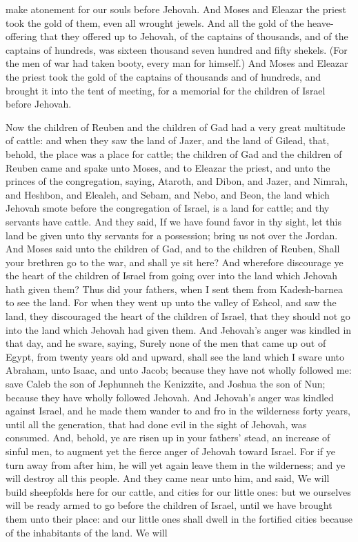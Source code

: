 make atonement for our souls before Jehovah. And Moses and Eleazar the priest took the gold of them, even all wrought jewels. And all the gold of the heave-offering that they offered up to Jehovah, of the captains of thousands, and of the captains of hundreds, was sixteen thousand seven hundred and fifty shekels. (For the men of war had taken booty, every man for himself.) And Moses and Eleazar the priest took the gold of the captains of thousands and of hundreds, and brought it into the tent of meeting, for a memorial for the children of Israel before Jehovah. 

Now the children of Reuben and the children of Gad had a very great multitude of cattle: and when they saw the land of Jazer, and the land of Gilead, that, behold, the place was a place for cattle; the children of Gad and the children of Reuben came and spake unto Moses, and to Eleazar the priest, and unto the princes of the congregation, saying, Ataroth, and Dibon, and Jazer, and Nimrah, and Heshbon, and Elealeh, and Sebam, and Nebo, and Beon, the land which Jehovah smote before the congregation of Israel, is a land for cattle; and thy servants have cattle. And they said, If we have found favor in thy sight, let this land be given unto thy servants for a possession; bring us not over the Jordan.  And Moses said unto the children of Gad, and to the children of Reuben, Shall your brethren go to the war, and shall ye sit here? And wherefore discourage ye the heart of the children of Israel from going over into the land which Jehovah hath given them? Thus did your fathers, when I sent them from Kadesh-barnea to see the land. For when they went up unto the valley of Eshcol, and saw the land, they discouraged the heart of the children of Israel, that they should not go into the land which Jehovah had given them. And Jehovah’s anger was kindled in that day, and he sware, saying, Surely none of the men that came up out of Egypt, from twenty years old and upward, shall see the land which I sware unto Abraham, unto Isaac, and unto Jacob; because they have not wholly followed me: save Caleb the son of Jephunneh the Kenizzite, and Joshua the son of Nun; because they have wholly followed Jehovah. And Jehovah’s anger was kindled against Israel, and he made them wander to and fro in the wilderness forty years, until all the generation, that had done evil in the sight of Jehovah, was consumed. And, behold, ye are risen up in your fathers’ stead, an increase of sinful men, to augment yet the fierce anger of Jehovah toward Israel. For if ye turn away from after him, he will yet again leave them in the wilderness; and ye will destroy all this people.  And they came near unto him, and said, We will build sheepfolds here for our cattle, and cities for our little ones: but we ourselves will be ready armed to go before the children of Israel, until we have brought them unto their place: and our little ones shall dwell in the fortified cities because of the inhabitants of the land. We will 